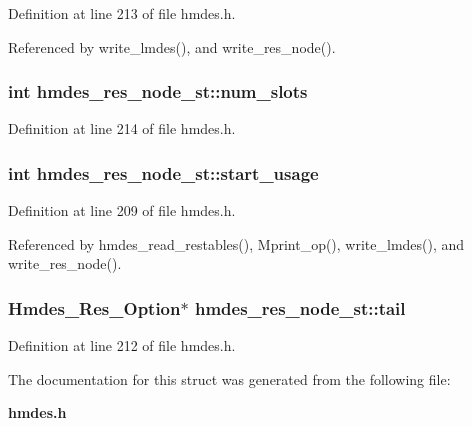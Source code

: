 Definition at line 213 of file hmdes.h.

Referenced by write\_\-lmdes(), and write\_\-res\_\-node().
\subsubsection{\setlength{\rightskip}{0pt plus 5cm}int \bf{hmdes\_\-res\_\-node\_\-st::num\_\-slots}}\label{structhmdes__res__node__st_c2ab5700dfa8ccb53b11c63926e2b037}




Definition at line 214 of file hmdes.h.
\subsubsection{\setlength{\rightskip}{0pt plus 5cm}int \bf{hmdes\_\-res\_\-node\_\-st::start\_\-usage}}\label{structhmdes__res__node__st_13ecad11606ad33168a8009d6f8fb7a4}




Definition at line 209 of file hmdes.h.

Referenced by hmdes\_\-read\_\-restables(), Mprint\_\-op(), write\_\-lmdes(), and write\_\-res\_\-node().
\subsubsection{\setlength{\rightskip}{0pt plus 5cm}\bf{Hmdes\_\-Res\_\-Option}$\ast$ \bf{hmdes\_\-res\_\-node\_\-st::tail}}\label{structhmdes__res__node__st_80c35ed255c1059aa4c7a9e1a7dbf9ff}




Definition at line 212 of file hmdes.h.

The documentation for this struct was generated from the following file:\begin{CompactItemize}
\item 
\bf{hmdes.h}\end{CompactItemize}
